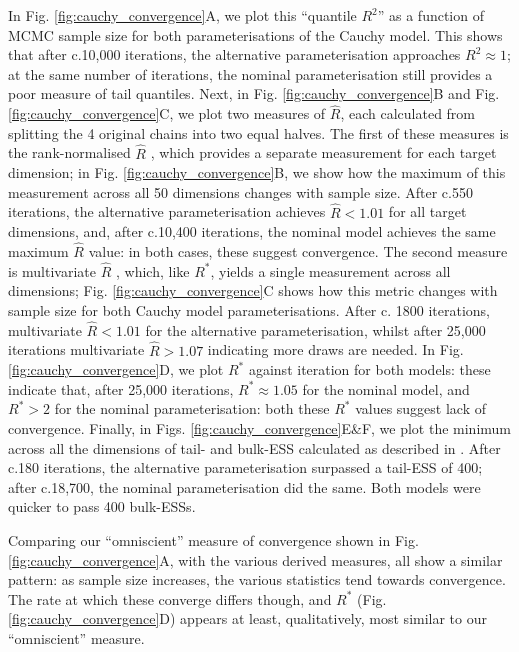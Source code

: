 \documentclass{article}
\begin{document}
In Fig. \ref{fig:cauchy_convergence}A, we plot this ``quantile $R^2$'' as a function of MCMC sample size for both parameterisations of the Cauchy model. This shows that after c.10,000 iterations, the alternative parameterisation approaches $R^2\approx 1$; at the same number of iterations, the nominal parameterisation still provides a poor measure of tail quantiles. Next, in Fig. \ref{fig:cauchy_convergence}B and Fig. \ref{fig:cauchy_convergence}C, we plot two measures of $\widehat{R}$, each calculated from splitting the 4 original chains into two equal halves. The first of these measures is the rank-normalised $\widehat{R}$ \citep{vehtari2019rank}, which provides a separate measurement for each target dimension; in Fig. \ref{fig:cauchy_convergence}B, we show how the maximum of this measurement across all 50 dimensions changes with sample size. After c.550 iterations, the alternative parameterisation achieves $\widehat{R}<1.01$ for all target dimensions, and, after c.10,400 iterations, the nominal model achieves the same maximum $\widehat{R}$ value: in both cases, these suggest convergence. The second measure is multivariate $\widehat{R}$ \citep{brooks1998general}, which, like $R^*$, yields a single measurement across all dimensions; Fig. \ref{fig:cauchy_convergence}C shows how this metric changes with sample size for both Cauchy model parameterisations. After c. 1800 iterations, multivariate $\widehat{R}<1.01$ for the alternative parameterisation, whilst after 25,000 iterations multivariate $\widehat{R}>1.07$ indicating more draws are needed. In Fig. \ref{fig:cauchy_convergence}D, we plot $R^*$ against iteration for both models: these indicate that, after 25,000 iterations, $R^*\approx 1.05$ for the nominal model, and $R^*>2$ for the nominal parameterisation: both these $R^*$ values suggest lack of convergence. Finally, in Figs. \ref{fig:cauchy_convergence}E\&F, we plot the minimum across all the dimensions of tail- and bulk-ESS calculated as described in \cite{vehtari2019rank}. After c.180 iterations, the alternative parameterisation surpassed a tail-ESS of 400; after c.18,700, the nominal parameterisation did the same. Both models were quicker to pass 400 bulk-ESSs.

Comparing our ``omniscient'' measure of convergence shown in Fig. \ref{fig:cauchy_convergence}A, with the various derived measures, all show a similar pattern: as sample size increases, the various statistics tend towards convergence. The rate at which these converge differs though, and $R^*$ (Fig. \ref{fig:cauchy_convergence}D) appears at least, qualitatively, most similar to our ``omniscient'' measure.
\end{document}
